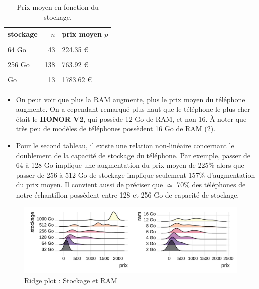 \documentclass[
  12pt,
]{report}
\begin{document}
\begin{table}[!h]
\centering
\caption{\label{tab:kable_2}Prix moyen en fonction du stockage.}
\centering
\begin{tabular}[t]{lrl}
\toprule
\textbf{stockage} & \textbf{$n$} & \textbf{prix moyen $\bar p$}\\
\midrule
\cellcolor{gray!10}{32 Go} & \cellcolor{gray!10}{16} & \cellcolor{gray!10}{100.09 €}\\
64 Go & 43 & 224.35 €\\
\cellcolor{gray!10}{128 Go} & \cellcolor{gray!10}{173} & \cellcolor{gray!10}{507.96 €}\\
256 Go & 138 & 763.92 €\\
\cellcolor{gray!10}{512 Go} & \cellcolor{gray!10}{49} & \cellcolor{gray!10}{1199.34 €}\\
\addlinespace
1000 Go & 13 & 1783.62 €\\
\bottomrule
\end{tabular}
\end{table}

\begin{itemize}
\item
  On peut voir que plus la RAM augmente, plus le prix moyen du téléphone
  augmente. On a cependant remarqué plus haut que le téléphone le plus
  cher était le \textbf{HONOR V2}, qui possède 12 Go de RAM, et non 16.
  À noter que très peu de modèles de téléphones possèdent 16 Go de RAM
  (2).
\item
  Pour le second tableau, il existe une relation non-linéaire concernant
  le doublement de la capacité de stockage du téléphone. Par exemple,
  passer de 64 à 128 Go implique une augmentation du prix moyen de 225\%
  alors que passer de 256 à 512 Go de stockage implique seulement 157\%
  d'augmentation du prix moyen. Il convient aussi de préciser que
  \(\simeq\) 70\% des téléphones de notre échantillon possèdent entre
  128 et 256 Go de capacité de stockage.
\end{itemize}

\begin{figure}[H]

{\centering \includegraphics{report_files/figure-pdf/ggplots-1.pdf}

}

\caption{Ridge plot : Stockage et RAM}

\end{figure}%
\end{document}
